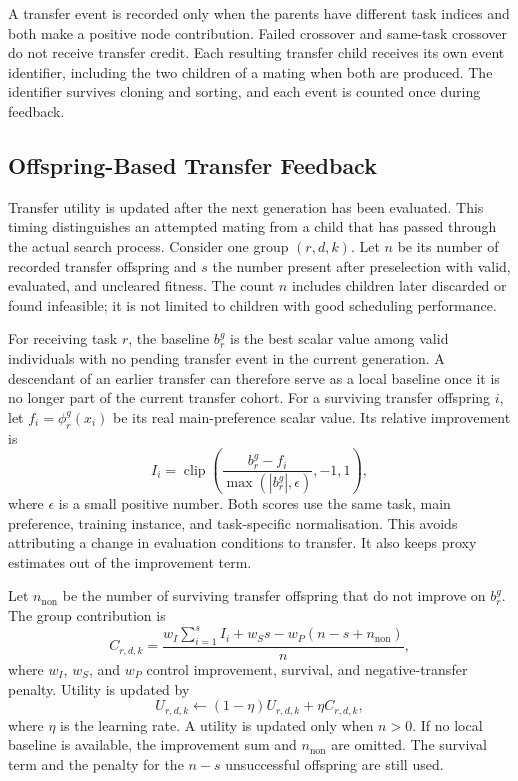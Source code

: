 \documentclass[10pt,journal]{IEEEtran}
\begin{document}
A transfer event is recorded only when the parents have different task indices and both make a positive node contribution. Failed crossover and same-task crossover do not receive transfer credit. Each resulting transfer child receives its own event identifier, including the two children of a mating when both are produced. The identifier survives cloning and sorting, and each event is counted once during feedback.

\subsection{Offspring-Based Transfer Feedback}
Transfer utility is updated after the next generation has been evaluated. This timing distinguishes an attempted mating from a child that has passed through the actual search process. Consider one group $(r,d,k)$. Let $n$ be its number of recorded transfer offspring and $s$ the number present after preselection with valid, evaluated, and uncleared fitness. The count $n$ includes children later discarded or found infeasible; it is not limited to children with good scheduling performance.

For receiving task $r$, the baseline $b_r^g$ is the best scalar value among valid individuals with no pending transfer event in the current generation. A descendant of an earlier transfer can therefore serve as a local baseline once it is no longer part of the current transfer cohort. For a surviving transfer offspring $i$, let $f_i=\phi_r^g(x_i)$ be its real main-preference scalar value. Its relative improvement is
\begin{equation}
 I_i=\operatorname{clip}\left(
 \frac{b_r^g-f_i}{\max(|b_r^g|,\epsilon)},-1,1\right),
 \label{eq:improvement}
\end{equation}
where $\epsilon$ is a small positive number. Both scores use the same task, main preference, training instance, and task-specific normalisation. This avoids attributing a change in evaluation conditions to transfer. It also keeps proxy estimates out of the improvement term.

Let $n_{\mathrm{non}}$ be the number of surviving transfer offspring that do not improve on $b_r^g$. The group contribution is
\begin{equation}
 C_{r,d,k}=
 \frac{w_I\sum_{i=1}^{s}I_i+w_S s-w_P(n-s+n_{\mathrm{non}})}{n},
 \label{eq:contribution}
\end{equation}
where $w_I$, $w_S$, and $w_P$ control improvement, survival, and negative-transfer penalty. Utility is updated by
\begin{equation}
 U_{r,d,k}\leftarrow(1-\eta)U_{r,d,k}+\eta C_{r,d,k},
 \label{eq:update}
\end{equation}
where $\eta$ is the learning rate. A utility is updated only when $n>0$. If no local baseline is available, the improvement sum and $n_{\mathrm{non}}$ are omitted. The survival term and the penalty for the $n-s$ unsuccessful offspring are still used.
\end{document}
